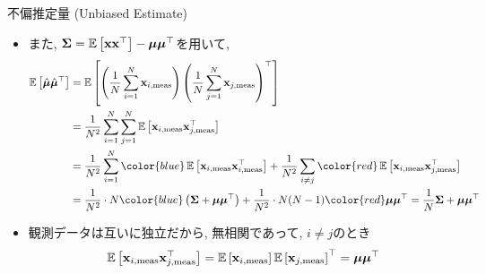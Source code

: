 \documentclass[dvipdfmx,notheorems,t]{beamer}
\begin{document}
\begin{frame}{不偏推定量 (Unbiased Estimate)}
\begin{itemize}
  \item また, \textcolor{blue}{$\vb{\Sigma} = \operatorname{\mathbb{E}} \left[ \vb{x} \vb{x}^\top \right] - \vb*{\mu} \vb*{\mu}^\top$}を用いて,
  {\small \begin{align*}
    \E{\hat{\vb*{\mu}} \hat{\vb*{\mu}}^\top} &= \E{
      \left( \frac{1}{N} \sum_{i = 1}^N \vb{x}_{i, \mathrm{meas}} \right)
      \left( \frac{1}{N} \sum_{j = 1}^N \vb{x}_{j, \mathrm{meas}} \right)^\top} \\
      &= \frac{1}{N^2} \sum_{i = 1}^N \sum_{j = 1}^N
        \E{\vb{x}_{i, \mathrm{meas}} \vb{x}_{j, \mathrm{meas}}^\top} \\
      &= \frac{1}{N^2} \sum_{i = 1}^N
        {\color{blue} \E{\vb{x}_{i, \mathrm{meas}} \vb{x}_{i, \mathrm{meas}}^\top}}
        + \frac{1}{N^2} \sum_{i \neq j}
        {\color{red}\E{\vb{x}_{i, \mathrm{meas}} \vb{x}_{j, \mathrm{meas}}^\top}} \\
      &= \frac{1}{N^2} \cdot N
        {\color{blue} \left( \vb{\Sigma} + \vb*{\mu} \vb*{\mu}^\top \right)}
        + \frac{1}{N^2} \cdot N (N - 1) {\color{red} \vb*{\mu} \vb*{\mu}^\top}
      = \frac{1}{N} \vb{\Sigma} + \vb*{\mu} \vb*{\mu}^\top
  \end{align*}}
  \item 観測データは互いに独立だから, 無相関であって, $i \neq j$のとき
  {\small \begin{align*}
    \operatorname{\mathbb{E}} \left[ \vb{x}_{i, \mathrm{meas}} \vb{x}_{j, \mathrm{meas}}^\top \right]
      = \operatorname{\mathbb{E}} \left[ \vb{x}_{i, \mathrm{meas}} \right] \operatorname{\mathbb{E}} \left[ \vb{x}_{j, \mathrm{meas}} \right]^\top
      = \vb*{\mu} \vb*{\mu}^\top
  \end{align*}}
\end{itemize}
\end{frame}
\end{document}

